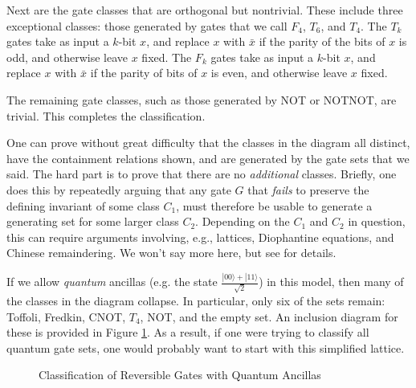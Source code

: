 \documentclass[12pt]{report}
\theoremstyle{plain}
\theoremstyle{definition}
\renewcommand{\ket}[1]{|#1\rangle}
\begin{document}
Next are the gate classes that are orthogonal but nontrivial. These include three exceptional classes: those generated by gates that we call $F_4$, $T_6$, and $T_4$.  The $T_k$ gates take as input a $k$-bit $x$, and replace $x$ with $\bar{x}$ if the parity of the bits of $x$ is odd, and otherwise leave $x$ fixed. The $F_k$ gates take as input a $k$-bit $x$, and replace $x$ with $\bar{x}$ if the parity of bits of $x$ is even, and otherwise leave $x$ fixed.

The remaining gate classes, such as those generated by NOT or NOTNOT, are trivial.  This completes the classification.

One can prove without great difficulty that the classes in the diagram all distinct, have the containment relations shown, and are generated by the gate sets that we said.  The hard part is to prove that there are no {\em additional} classes.  Briefly, one does this by repeatedly arguing that any gate $G$ that {\em fails} to preserve the defining invariant of some class $C_1$, must therefore be usable to generate a generating set for some larger class $C_2$.  Depending on the $C_1$ and $C_2$ in question, this can require arguments involving, e.g., lattices, Diophantine equations, and Chinese remaindering.  We won't say more here, but see \cite{ReversibleGates} for details.

If we allow {\em quantum} ancillas (e.g. the state $\frac{\ket{00}+\ket{11}}{\sqrt{2}}$) in this model, then many of the classes in the diagram collapse. In particular, only six of the sets remain: Toffoli, Fredkin, CNOT, $T_4$, NOT, and the empty set. An inclusion diagram for these is provided in Figure \ref{ReversibleFigureWithQuantumAncillas}. As a result, if one were trying to classify all quantum gate sets, one would probably want to start with this simplified lattice.

\begin{figure}[h]
\begin{center}
\end{center}
\caption{Classification of Reversible Gates with Quantum Ancillas}
\label{ReversibleFigureWithQuantumAncillas}
\end{figure}
\end{document}
